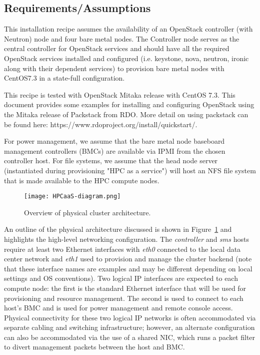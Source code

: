\subsection{Requirements/Assumptions}

This installation recipe assumes the availability of an OpenStack controller (with Neutron) node and four bare metal nodes. The Controller node serves as the central controller for OpenStack services and should have all the required OpenStack services installed and configured (i.e. keystone, nova, neutron, ironic along with their dependent services) to provision bare metal nodes with CentOS7.3 in a state-full 
configuration. 

This recipe is tested with OpenStack Mitaka release with CentOS 7.3. This document provides some examples for installing and configuring OpenStack using the Mitaka release of Packstack from RDO. More detail on using packstack can be found here: https://www.rdoproject.org/install/quickstart/. 

For power management, we assume that the bare metal node baseboard management controllers (BMCs) are available via IPMI from the chosen controller host. For file systems, we assume that the head node server (instantiated during provisioning "HPC as a service") will host an NFS file system that is made available to the HPC compute nodes.



\begin{figure}[hbt]
\center
\texttt{[image: HPCaaS-diagram.png]}
\vspace*{-0.2cm}
\caption{Overview of physical cluster architecture.} \label{fig:physical_arch}
\end{figure}
\mbox{}

\vspace*{0.5cm}

An outline of the physical architecture discussed is shown in
Figure~\ref{fig:physical_arch} and highlights the high-level networking
configuration. The {\em controller} and {\em sms} hosts require at least two Ethernet interfaces with {\em eth0} connected to the local data center network and {\em eth1} used to provision and manage the cluster backend (note that these interface names are examples and may be different depending on local settings and OS conventions). Two logical IP interfaces are expected to each compute node: the first is the standard Ethernet interface that will be used for provisioning and resource management. The second is used to connect to each host's BMC and is used for power management and remote console access. Physical connectivity for these two logical IP networks is often accommodated via separate cabling and switching infrastructure; however, an alternate configuration can also be accommodated via the use of a shared NIC, which runs a packet filter to divert management packets between the host and BMC.

